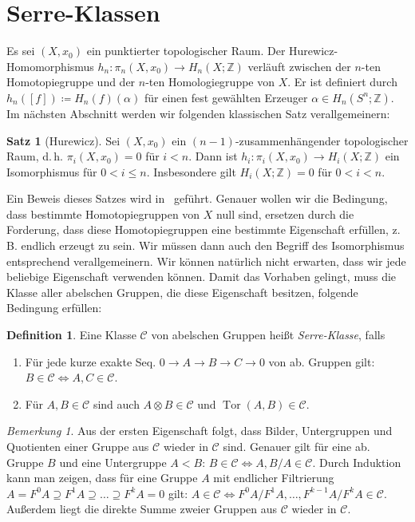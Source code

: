 \documentclass[11pt, a4paper, german]{article}
\theoremstyle{definition}
\newtheorem{satz}[lem]{Satz}
\newtheorem{defn}[lem]{Definition}
\theoremstyle{remark}
\newtheorem*{bem}{Bemerkung}
\newcommand{\Z}{\mathbb{Z}} %
\DeclareMathOperator{\Tor}{Tor} %
\newcommand{\SC}{\mathcal{C}} %
\newcommand{\zB}{z.\,B.}
\renewcommand{\dh}{d.\,h.} %
\begin{document}
\section{Serre-Klassen}

Es sei $(X, x_0)$ ein punktierter topologischer Raum.
Der Hurewicz-Homomorphismus $h_n : \pi_n(X, x_0) \to H_n(X; \Z)$ verläuft zwischen der $n$-ten Homotopiegruppe und der $n$-ten Homologiegruppe von $X$.
Er ist definiert durch $h_n([f]) \coloneqq H_n(f)(\alpha)$ für einen fest gewählten Erzeuger $\alpha \in H_n(S^n; \Z)$.
Im nächsten Abschnitt werden wir folgenden klassischen Satz verallgemeinern:

\begin{satz}[Hurewicz]
  Sei $(X, x_0)$ ein $(n{-}1)$-zusammenhängender topologischer Raum, \dh{} $\pi_i(X, x_0) = 0$ für $i < n$.
  Dann ist $h_i : \pi_i(X, x_0) \to H_i(X; \Z)$ ein Isomorphismus für $0 < i \leq n$.
  Insbesondere gilt $H_i(X; \Z) = 0$ für $0 < i < n$.
\end{satz}

Ein Beweis dieses Satzes wird in~\cite[Thm 4.32]{hatcher:at} geführt.
Genauer wollen wir die Bedingung, dass bestimmte Homotopiegruppen von $X$ null sind, ersetzen durch die Forderung, dass diese Homotopiegruppen eine bestimmte Eigenschaft erfüllen, \zB{} endlich erzeugt zu sein.
Wir müssen dann auch den Begriff des Isomorphismus entsprechend verallgemeinern.
Wir können natürlich nicht erwarten, dass wir jede beliebige Eigenschaft verwenden können.
Damit das Vorhaben gelingt, muss die Klasse aller abelschen Gruppen, die diese Eigenschaft besitzen, folgende Bedingung erfüllen:

\begin{defn}\label{serre-class}
  Eine Klasse $\SC$ von abelschen Gruppen heißt \emph{Serre-Klasse}, falls
  \begin{enumerate}[label=(\Roman*)]
    \item Für jede kurze exakte Seq. $0 \to A \to B \to C \to 0$ von ab. Gruppen gilt: $B \in \SC \Leftrightarrow A, C \in \SC$.
    \item Für $A, B \in \SC$ sind auch $A \otimes B \in \SC$ und $\Tor(A, B) \in \SC$.
  \end{enumerate}
\end{defn}

\begin{bem}
  Aus der ersten Eigenschaft folgt, dass Bilder, Untergruppen und Quotienten einer Gruppe aus $\SC$ wieder in $\SC$ sind.
  Genauer gilt für eine ab. Gruppe $B$ und eine Untergruppe $A < B$: $B \in \SC \iff A, B/A \in \SC$.
  Durch Induktion kann man zeigen, dass für eine Gruppe $A$ mit endlicher Filtrierung
  $A = F^0 A \supseteq F^1 A \supseteq \ldots \supseteq F^k A = 0$
  gilt: $A \in \SC \iff F^0 A / F^1 A, \ldots, F^{k-1} A / F^k A \in \SC$.
  Außerdem liegt die direkte Summe zweier Gruppen aus $\SC$ wieder in $\SC$.
\end{bem}
\end{document}
